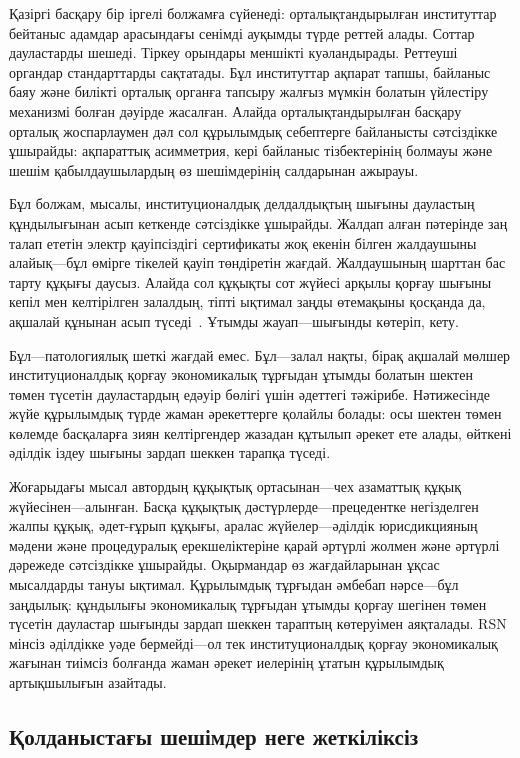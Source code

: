 \documentclass[11pt,a4paper,twocolumn]{article}
\begin{document}
Қазіргі басқару бір іргелі болжамға сүйенеді: орталықтандырылған институттар бейтаныс адамдар арасындағы сенімді ауқымды түрде реттей алады. Соттар дауластарды шешеді. Тіркеу орындары меншікті куәландырады. Реттеуші органдар стандарттарды сақтатады. Бұл институттар ақпарат тапшы, байланыс баяу және билікті орталық органға тапсыру жалғыз мүмкін болатын үйлестіру механизмі болған дәуірде жасалған. Алайда орталықтандырылған басқару орталық жоспарлаумен дәл сол құрылымдық себептерге байланысты сәтсіздікке ұшырайды: ақпараттық асимметрия, кері байланыс тізбектерінің болмауы және шешім қабылдаушылардың өз шешімдерінің салдарынан ажырауы.

Бұл болжам, мысалы, институционалдық делдалдықтың шығыны дауластың құндылығынан асып кеткенде сәтсіздікке ұшырайды. Жалдап алған пәтерінде заң талап ететін электр қауіпсіздігі сертификаты жоқ екенін білген жалдаушыны алайық---бұл өмірге тікелей қауіп төндіретін жағдай. Жалдаушының шарттан бас тарту құқығы даусыз. Алайда сол құқықты сот жүйесі арқылы қорғау шығыны кепіл мен келтірілген залалдың, тіпті ықтимал заңды өтемақыны қосқанда да, ақшалай құнынан асып түседі~\cite{czcourtfees}. Ұтымды жауап---шығынды көтеріп, кету.

Бұл---патологиялық шеткі жағдай емес. Бұл---залал нақты, бірақ ақшалай мөлшер институционалдық қорғау экономикалық тұрғыдан ұтымды болатын шектен төмен түсетін дауластардың едәуір бөлігі үшін әдеттегі тәжірибе. Нәтижесінде жүйе құрылымдық түрде жаман әрекеттерге қолайлы болады: осы шектен төмен көлемде басқаларға зиян келтіргендер жазадан құтылып әрекет ете алады, өйткені әділдік іздеу шығыны зардап шеккен тарапқа түседі.

Жоғарыдағы мысал автордың құқықтық ортасынан---чех азаматтық құқық жүйесінен---алынған. Басқа құқықтық дәстүрлерде---прецедентке негізделген жалпы құқық, әдет-ғұрып құқығы, аралас жүйелер---әділдік юрисдикцияның мәдени және процедуралық ерекшеліктеріне қарай әртүрлі жолмен және әртүрлі дәрежеде сәтсіздікке ұшырайды. Оқырмандар өз жағдайларынан ұқсас мысалдарды тануы ықтимал. Құрылымдық тұрғыдан әмбебап нәрсе---бұл заңдылық: құндылығы экономикалық тұрғыдан ұтымды қорғау шегінен төмен түсетін дауластар шығынды зардап шеккен тараптың көтеруімен аяқталады. RSN мінсіз әділдікке уәде бермейді---ол тек институционалдық қорғау экономикалық жағынан тиімсіз болғанда жаман әрекет иелерінің ұтатын құрылымдық артықшылығын азайтады.

\subsection{Қолданыстағы шешімдер неге жеткіліксіз}
\end{document}
